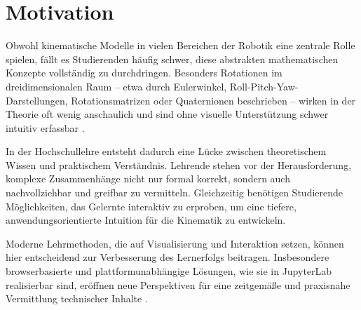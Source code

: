 \section{Motivation}
Obwohl kinematische Modelle in vielen Bereichen der Robotik eine zentrale Rolle spielen, fällt es Studierenden häufig schwer,
diese abstrakten mathematischen Konzepte vollständig zu durchdringen. Besonders Rotationen im dreidimensionalen Raum – etwa durch Eulerwinkel,
Roll-Pitch-Yaw-Darstellungen, Rotationsmatrizen oder Quaternionen beschrieben – wirken in der Theorie oft wenig anschaulich und sind ohne visuelle
Unterstützung schwer intuitiv erfassbar \cite[94-95]{The_Second_Handbook_of_Research_on_the_Psychology_of_Mathematics_Education}.

In der Hochschullehre entsteht dadurch eine Lücke zwischen theoretischem Wissen und praktischem Verständnis.
Lehrende stehen vor der Herausforderung, komplexe Zusammenhänge nicht nur formal korrekt, sondern auch nachvollziehbar und greifbar zu vermitteln.
Gleichzeitig benötigen Studierende Möglichkeiten, das Gelernte interaktiv zu erproben, um eine tiefere, anwendungsorientierte Intuition für die Kinematik zu entwickeln.

Moderne Lehrmethoden, die auf Visualisierung und Interaktion setzen, können hier entscheidend zur Verbesserung des Lernerfolgs beitragen.
Insbesondere browserbasierte und plattformunabhängige Lösungen, wie sie in JupyterLab realisierbar sind,
eröffnen neue Perspektiven für eine zeitgemäße und praxisnahe Vermittlung technischer Inhalte \cite[239-240,407]{The_Second_Handbook_of_Research_on_the_Psychology_of_Mathematics_Education}.
